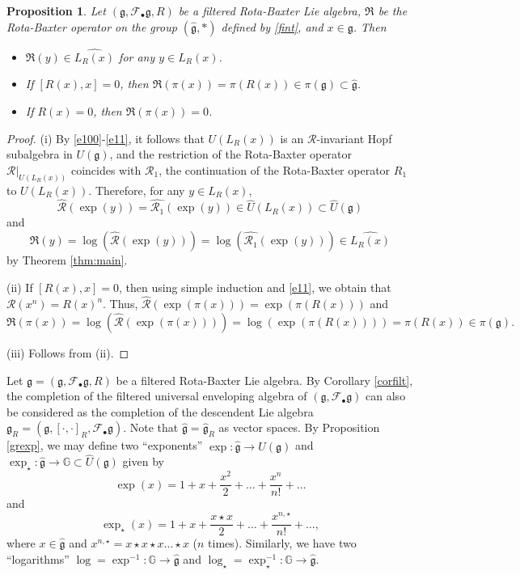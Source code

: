 \documentclass[12pt]{amsart}
\newtheorem{pro}[thm]{Proposition}
\theoremstyle{definition}   %
\newcommand{\g}{\mathfrak g}
\newcommand{\G}{\mathbb G}
\newcommand{\huaR}{\mathcal{R}}
\newcommand{\huaF}{\mathcal{F}}
\newcommand{\frkR}{\mathfrak R}
\begin{document}
\begin{pro}
Let $(\g, \huaF_{\bullet}\g, R)$ be a filtered Rota-Baxter Lie algebra, $\frkR$ be the Rota-Baxter operator on the group $(\widehat {\g},*)$ defined by \eqref{fint}, and $x\in \g$. Then
\begin{itemize}
\item[{\rm(i)}] $\frkR(y)\in \widehat{L_R(x)}$ for any $y\in L_R(x)$.
\item[{\rm(ii)}] If $[R(x),x]=0$, then $\frkR(\pi(x))=\pi(R(x))\in \pi(\g)\subset \widehat{\g}$.
\item[{\rm(iii)}] If $R(x)=0$, then $\frkR(\pi(x))=0$.
\end{itemize}
\end{pro}
\begin{proof}
(i) By \eqref{e100}-\eqref{e11}, it follows that $U(L_R(x))$ is an $\huaR$-invariant Hopf subalgebra in $U(\g)$, and the restriction of the Rota-Baxter operator $\huaR|_{U(L_R(x))}$ coincides with $\huaR_1$, the continuation of the Rota-Baxter operator $R_1$ to $U(L_R(x))$. Therefore, for any $y\in L_R(x)$,
$$\widehat{\huaR}(\exp(y))=\widehat{\huaR_1}(\exp(y))\in \widehat{U}(L_R(x))\subset \widehat{U}(\g)$$
and
$$\frkR(y)=\log(\widehat{\huaR}(\exp(y)))=\log(\widehat{\huaR_1}(\exp(y)))\in \widehat{L_R(x)}$$
by Theorem \ref{thm:main}.

(ii) If $[R(x),x]=0$, then using simple induction and \eqref{e11}, we obtain that $\huaR(x^n)=R(x)^n$. Thus, $\widehat{\huaR}(\exp(\pi(x)))=\exp(\pi(R(x)))$ and  $$\frkR(\pi(x))=\log(\widehat{\huaR}(\exp(\pi(x))))=\log(\exp(\pi(R(x))))=\pi(R(x))\in \pi(\g).$$

(iii) Follows from (ii).
\end{proof}

Let $\g=(\g,\huaF_{\bullet}\g,R)$ be a filtered Rota-Baxter Lie algebra. By Corollary \ref{corfilt}, the completion of the filtered universal enveloping algebra of $(\g,\huaF_{\bullet}\g)$ can also be considered as the completion of the descendent Lie algebra $\g_R=(\g,[\cdot,\cdot]_R,\huaF_{\bullet}\g)$. Note that  $\widehat{\g}=\widehat{\g}_R$ as vector spaces. By Proposition \ref{grexp}, we may define two ``exponents'' $\exp:\widehat{\g}\rightarrow \widehat{U}(\g)$ and $\exp_{\star}:\widehat{\g}\rightarrow \G\subset \widehat{U}(\g)$ given by
$$
\exp(x)=1+x+\frac{x^2}{2}+\ldots+\frac{x^n}{n!}+\ldots
$$
and
$$
\exp_{\star}(x)=1+x+\frac{x{\star}x}{2}+\ldots+\frac{x^{n,\star}}{n!}+\ldots,
$$
where $x\in \widehat{\g}$ and $x^{n,\star}=x{\star}x{\star}x\ldots{\star}x$ ($n$ times). Similarly, we have two ``logarithms'' $\log=\exp^{-1}:\G\rightarrow \widehat{\g}$ and $\log_{\star}=\exp_{\star}^{-1}:\G\rightarrow \widehat{\g}$.
\end{document}
